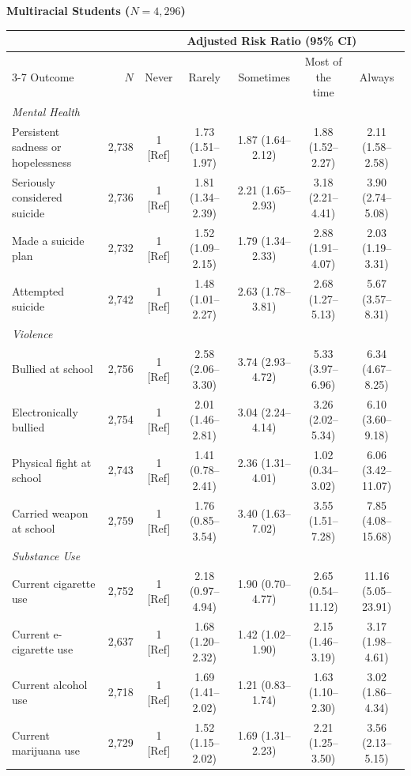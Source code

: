 \documentclass[12pt]{article}
\begin{document}
\begin{landscape}
\nobreak\noindent\textbf{Multiracial Students ($N = 4,296$)}
\nopagebreak\par\nopagebreak\vspace{1pt}\nopagebreak
\nobreak\noindent\begin{tabular}{l r ccccc}
\toprule
 & & \multicolumn{5}{c}{Adjusted Risk Ratio (95\% CI)} \\
\cmidrule(lr){3-7}
Outcome & $N$ & Never & Rarely & Sometimes & Most of the time & Always \\
\midrule
\textit{Mental Health} \\
\quad Persistent sadness or hopelessness & 2,738 & 1 [Ref] & 1.73 (1.51--1.97) & 1.87 (1.64--2.12) & 1.88 (1.52--2.27) & 2.11 (1.58--2.58) \\
\quad Seriously considered suicide & 2,736 & 1 [Ref] & 1.81 (1.34--2.39) & 2.21 (1.65--2.93) & 3.18 (2.21--4.41) & 3.90 (2.74--5.08) \\
\quad Made a suicide plan & 2,732 & 1 [Ref] & 1.52 (1.09--2.15) & 1.79 (1.34--2.33) & 2.88 (1.91--4.07) & 2.03 (1.19--3.31) \\
\quad Attempted suicide & 2,742 & 1 [Ref] & 1.48 (1.01--2.27) & 2.63 (1.78--3.81) & 2.68 (1.27--5.13) & 5.67 (3.57--8.31) \\
\addlinespace[4pt]
\textit{Violence} \\
\quad Bullied at school & 2,756 & 1 [Ref] & 2.58 (2.06--3.30) & 3.74 (2.93--4.72) & 5.33 (3.97--6.96) & 6.34 (4.67--8.25) \\
\quad Electronically bullied & 2,754 & 1 [Ref] & 2.01 (1.46--2.81) & 3.04 (2.24--4.14) & 3.26 (2.02--5.34) & 6.10 (3.60--9.18) \\
\quad Physical fight at school & 2,743 & 1 [Ref] & 1.41 (0.78--2.41) & 2.36 (1.31--4.01) & 1.02 (0.34--3.02) & 6.06 (3.42--11.07) \\
\quad Carried weapon at school & 2,759 & 1 [Ref] & 1.76 (0.85--3.54) & 3.40 (1.63--7.02) & 3.55 (1.51--7.28) & 7.85 (4.08--15.68) \\
\addlinespace[4pt]
\textit{Substance Use} \\
\quad Current cigarette use & 2,752 & 1 [Ref] & 2.18 (0.97--4.94) & 1.90 (0.70--4.77) & 2.65 (0.54--11.12) & 11.16 (5.05--23.91) \\
\quad Current e-cigarette use & 2,637 & 1 [Ref] & 1.68 (1.20--2.32) & 1.42 (1.02--1.90) & 2.15 (1.46--3.19) & 3.17 (1.98--4.61) \\
\quad Current alcohol use & 2,718 & 1 [Ref] & 1.69 (1.41--2.02) & 1.21 (0.83--1.74) & 1.63 (1.10--2.30) & 3.02 (1.86--4.34) \\
\quad Current marijuana use & 2,729 & 1 [Ref] & 1.52 (1.15--2.02) & 1.69 (1.31--2.23) & 2.21 (1.25--3.50) & 3.56 (2.13--5.15) \\
\bottomrule
\end{tabular}\par\vspace{8pt}

\normalsize
\end{landscape}
\end{document}
